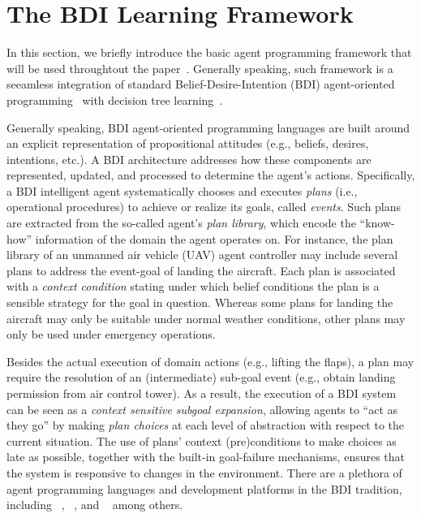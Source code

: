 \section{The BDI Learning Framework}\label{sec:framework}

In this section, we briefly introduce the basic agent programming framework that will be used throughtout the paper~\cite{airiau09:enhancing,singh10:extending,singh10:learning}.
Generally speaking, such framework is a seeamless integration of standard Belief-Desire-Intention (BDI) agent-oriented programming~\cite{Rao96:AgentSpeak,WooldridgeBook} with decision tree learning~\cite{Mitchell97:ML}. 

Generally speaking, BDI agent-oriented programming languages are built around an explicit representation of propositional attitudes (e.g., beliefs, desires, intentions, etc.). A BDI architecture addresses how these components are represented, updated, and processed to determine the agent's actions.
Specifically, a BDI intelligent agent systematically chooses and executes \emph{plans} (i.e., operational procedures) to achieve or realize its goals, called \emph{events}.
Such plans are extracted from the so-called agent's \emph{plan library}, which encode the ``know-how'' information of the domain the agent operates on.
For instance, the plan library of an unmanned air vehicle (UAV) agent controller may include several plans to address the event-goal of landing the aircraft. Each plan is associated with a \emph{context condition} stating under which belief conditions the plan is a sensible strategy for the goal in question. Whereas some plans for landing the aircraft may only be suitable under normal weather conditions, other plans may only be used under emergency operations.

Besides the actual execution of domain actions (e.g., lifting the flaps), a plan may require the resolution of an (intermediate) sub-goal event (e.g., obtain landing permission from air control tower).
As a result, the execution of a BDI system can be seen as a \textit{context sensitive subgoal expansion}, allowing agents to ``act as they go'' by making \emph{plan choices} at each level of abstraction with respect to the current situation. The use of plans' context (pre)conditions to make choices as late as possible, together with the built-in goal-failure mechanisms, ensures that the system is responsive to changes in the environment. 
There are a plethora of agent programming languages and development platforms in the BDI tradition, including
\JACK~\cite{BusettaRHL:AL99-JACK}, 
\JADEX~\cite{PokahrBL:EXP03-JADEX}, and
\JASON~\cite{jasonbook}
among others. 


